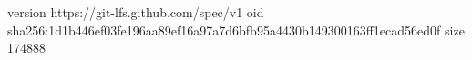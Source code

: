 version https://git-lfs.github.com/spec/v1
oid sha256:1d1b446ef03fe196aa89ef16a97a7d6bfb95a4430b149300163ff1ecad56ed0f
size 174888
